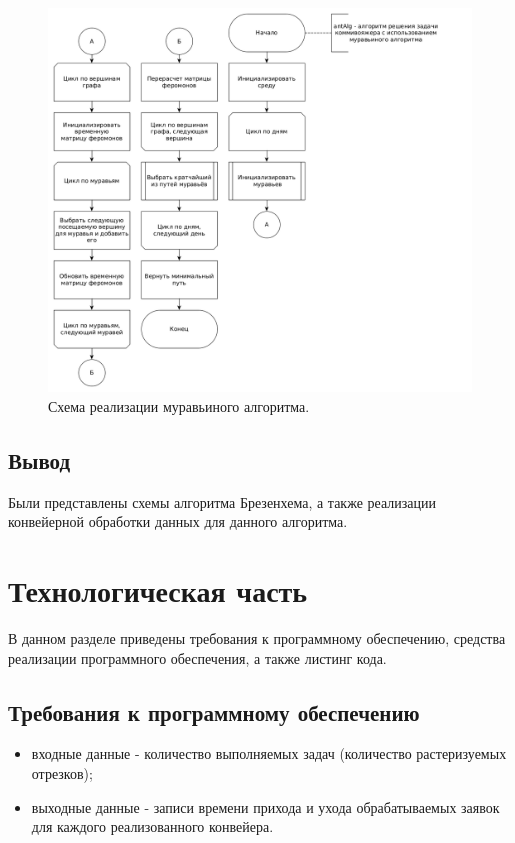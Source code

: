 \documentclass[12pt]{report}
\begin{document}
\begin{figure}[ht]
\begin{center}
\includegraphics[scale=0.4]{inc/img/antAlg.png}
\captionsetup{justification=centering}
	\caption{Схема реализации муравьиного алгоритма.}
	\label{img:antAlg}	
\end{center}
\end{figure}

\section*{Вывод}
Были представлены схемы алгоритма Брезенхема, а также реализации конвейерной обработки данных для данного алгоритма.

\chapter{Технологическая часть}
В данном разделе приведены требования к программному обеспечению, средства реализации программного обеспечения, а также листинг кода.

\section{Требования к программному обеспечению}
\begin{itemize}
\item входные данные - количество выполняемых задач (количество растеризуемых отрезков);
\item выходные данные - записи времени прихода и ухода обрабатываемых заявок для каждого реализованного конвейера.
\end{itemize}
\end{document}
